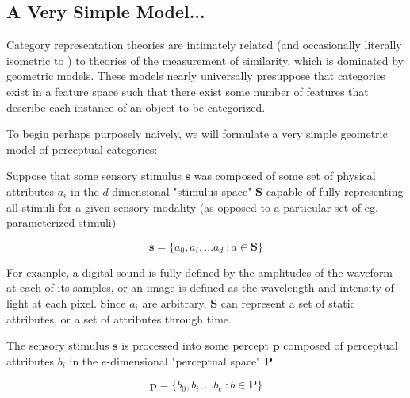 
\subsection{A Very Simple Model...}

Category representation theories are intimately related (and occasionally literally isometric to \citep{Edelman1998}) to theories of the measurement of similarity, which is dominated by geometric models\citep{Tversky1977}. These models nearly universally presuppose that categories exist in a feature space such that there exist some number of features that describe each instance of an object to be categorized.

To begin perhaps purposely naively, we will formulate a very simple geometric model of perceptual categories:

Suppose that some sensory stimulus $\mathbf{s}$ was composed of some set of physical attributes $a_i$ in the $d$-dimensional "stimulus space" $\mathbf{S}$ capable of fully representing all stimuli for a given sensory modality (as opposed to a particular set of eg. parameterized stimuli)

\begin{equation}
\label{eqn:s}
\mathbf{s} = \{a_0, a_i, \dots a_d\ : a \in \mathbf{S}\}
\end{equation}

For example, a digital sound is fully defined by the amplitudes of the waveform at each of its samples, or an image is defined as the wavelength and intensity of light at each pixel.  Since $a_i$ are arbitrary, $\mathbf{S}$ can represent a set of static attributes, or a set of attributes through time.

The sensory stimulus $\mathbf{s}$ is processed into some percept $\mathbf{p}$ composed of perceptual attributes $b_i$ in the $e$-dimensional "perceptual space" $\mathbf{P}$

\begin{equation}
\label{eqn:p}
\mathbf{p} = \{b_0, b_i, \dots b_e\ : b \in \mathbf{P}\}
\end{equation}

